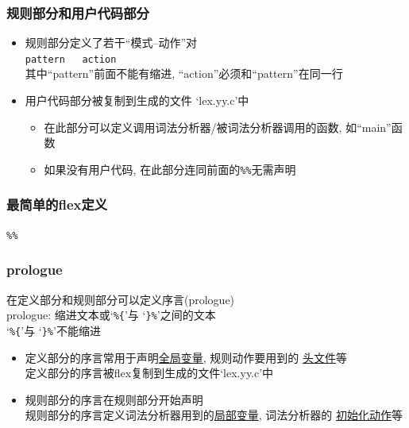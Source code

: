 \documentclass[compress]{beamer}
\begin{document}
\begin{frame}[containsverbatim]
\frametitle{规则部分和用户代码部分}

\begin{itemize}
\item 规则部分定义了若干``模式--动作''对\\
\verb~pattern   action~\\
其中``pattern''前面不能有缩进, ``action''必须和``pattern''在同一行
\item 用户代码部分被复制到生成的文件 `lex.yy.c'中
  \begin{itemize}
	\item 在此部分可以定义调用词法分析器/被词法分析器调用的函数, 如``main''函数
	\item 如果没有用户代码, 在此部分连同前面的\verb~%%~无需声明
\end{itemize}
\end{itemize}
\end{frame}

\begin{frame}[containsverbatim]
  \frametitle{最简单的{flex}定义}

\verb~%%~

\end{frame}

\begin{frame}[containsverbatim]
\frametitle{prologue}

在定义部分和规则部分可以定义序言(prologue)\\
prologue: 缩进文本或`\verb~%{~'与 `\verb~}%~'之间的文本 \\
`\verb~%{~'与 `\verb~}%~'不能缩进

\begin{itemize}
  \item 定义部分的序言常用于声明\uline{全局变量}, 规则动作要用到的
    \uline{头文件}等\\
定义部分的序言被{flex}复制到生成的文件`lex.yy.c'中
\item 规则部分的序言在规则部分开始声明\\
  规则部分的序言定义词法分析器用到的\uline{局部变量}, 词法分析器的
  \uline{初始化动作}等
\end{itemize}

\end{frame}
\end{document}
